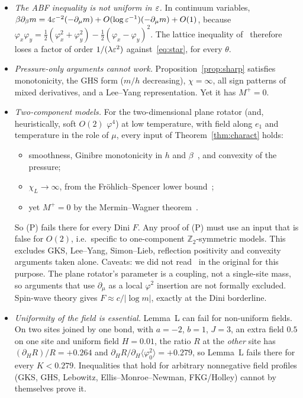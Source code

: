 \begin{itemize}
\item[(O1)] \emph{The ABF inequality is not uniform in $\varepsilon$.} In continuum variables, $\beta\partial_\beta m=4\varepsilon^{-2}(-\partial_\mu m)+O(\log\varepsilon^{-1})(-\partial_\mu m)+O(1)$, because $\varphi_x\varphi_y=\frac12(\varphi_x^2+\varphi_y^2)-\frac12(\varphi_x-\varphi_y)^2$. The lattice inequality of~\cite{ABF87} therefore loses a factor of order $1/(\lambda\varepsilon^2)$ against~\eqref{eq:star}, for every $\theta$.
\item[(O2)] \emph{Pressure-only arguments cannot work.} Proposition~\ref{prop:sharp} satisfies monotonicity, the GHS form ($m/h$ decreasing), $\chi=\infty$, all sign patterns of mixed derivatives, and a Lee--Yang representation. Yet it has $M^+=0$.
\item[(O3)] \emph{Two-component models.} For the two-dimensional plane rotator (and, heuristically, soft $O(2)$ $\varphi^4$) at low temperature, with field along $e_1$ and temperature in the role of $\mu$, every input of Theorem~\ref{thm:charact} holds:
\begin{itemize}
\item smoothness, Ginibre monotonicity in $h$ and $\beta$~\cite{Gin70}, and convexity of the pressure;
\item $\chi_L\to\infty$, from the Fr\"ohlich--Spencer lower bound~\cite{FS81};
\item yet $M^+=0$ by the Mermin--Wagner theorem~\cite{Mer67}.
\end{itemize}
So (P) fails there for every Dini $F$. Any proof of (P) must use an input that is false for $O(2)$, i.e.\ specific to one-component $\mathbb Z_2$-symmetric models. This excludes GKS, Lee--Yang, Simon--Lieb, reflection positivity and convexity arguments taken alone. Caveats: we did not read~\cite{FS81,Mer67} in the original for this purpose. The plane rotator's parameter is a coupling, not a single-site mass, so arguments that use $\partial_\mu$ as a local $\varphi^2$ insertion are not formally excluded. Spin-wave theory gives $F\approx c/|\log m|$, exactly at the Dini borderline.
\item[(O4)] \emph{Uniformity of the field is essential.} Lemma~L can fail for non-uniform fields. On two sites joined by one bond, with $a=-2$, $b=1$, $J=3$, an extra field $0.5$ on one site and uniform field $H=0.01$, the ratio $R$ at the \emph{other} site has $(\partial_HR)/R=+0.264$ and $\partial_HR/\partial_H\langle\varphi_0^2\rangle=+0.279$, so Lemma~L fails there for every $K<0.279$. Inequalities that hold for arbitrary nonnegative field profiles (GKS, GHS, Lebowitz, Ellis--Monroe--Newman, FKG/Holley) cannot by themselves prove it.

\end{itemize}
